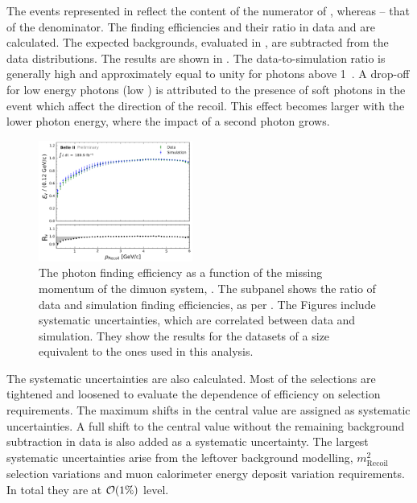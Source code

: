 The events represented in  reflect the content of the numerator of , whereas  -- that of the denominator.
The finding efficiencies and their ratio in data and \MC are calculated.
The expected backgrounds, evaluated in \MC, are subtracted from the data distributions.
The results are shown in .
The data-to-simulation ratio is generally high and approximately equal to unity for photons above 1~\gev.
A drop-off for low energy photons (low \pRecoil) is attributed to the presence of soft \ISR photons in the event which affect the direction of the recoil.
This effect becomes larger with the lower photon energy, where the impact of a second \ISR photon grows.
\begin{figure}[htbp!]
    \centering
    \includegraphics[width=0.45\textwidth]{figures/data_sim_corrections/pyth_data_mc_agreement_pRecoil.pdf}
    \caption{\label{fig:data_mc_photon_eff} The photon finding efficiency as a function of the missing momentum of the dimuon system, \pRecoil.
    The subpanel shows the ratio of data and simulation finding efficiencies, as per .
    The Figures include systematic uncertainties, which are correlated between data and simulation.
    They show the results for the datasets of a size equivalent to the ones used in this analysis.
    }
\end{figure}

The systematic uncertainties are also calculated.
Most of the selections are tightened and loosened to evaluate the dependence of efficiency on selection requirements.
The maximum shifts in the central value are assigned as systematic uncertainties.
A full shift to the central value without the remaining background subtraction in data is also added as a systematic uncertainty.
The largest systematic uncertainties arise from the leftover background modelling, $m^2_{\mathrm{Recoil}}$ selection variations and muon calorimeter energy deposit variation requirements.
In total they are at ${\cal O}(1\%)$ level.

